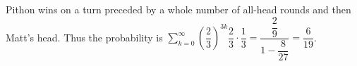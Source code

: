 Pithon wins on a turn preceded by a whole number of all-head rounds and then Matt's head. Thus the probability is $\sum_{k=0}^\infty(\dfrac{2}{3})^{3k}\dfrac{2}{3}\cdot\dfrac{1}{3}=\dfrac{\dfrac{2}{9}}{1-\dfrac{8}{27}}=\boxed{\dfrac{6}{19}}$.
